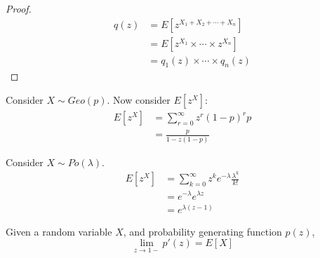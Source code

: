 \documentclass[../Main.tex]{subfiles}
\begin{document}
\begin{proof}
    \begin{align*}
        q(z) &= E[z^{X_1 + X_2 + \cdots + X_n}] \\
        &= E[z^{X_1} \times \cdots \times z^{X_n}] \\
        &= q_1(z) \times \cdots \times q_n(z)
    \end{align*}
\end{proof}
\begin{example}
    Consider $X \sim Geo(p)$. Now consider $E[z^X]$:
    \begin{align*}
        E[z^X] &= \sum_{r=0}^\infty z^r (1-p)^r p \\
        &= \frac{p}{1-z(1-p)}
    \end{align*}
\end{example}
\begin{example}
    Consider $X \sim Po(\lambda)$.
    \begin{align*}
        E[z^X] &= \sum_{k=0}^\infty z^k e^{-\lambda} \frac{\lambda^k}{k!} \\
        &= e^{-\lambda} e^{\lambda z} \\
        &= e^{\lambda (z-1)}
    \end{align*}
\end{example}
\begin{theorem}
    Given a random variable $X$, and probability generating function $p(z)$,
    \begin{equation*}
        \lim_{z \to 1-} p'(z) = E[X]
    \end{equation*}
\end{theorem}
\end{document}
